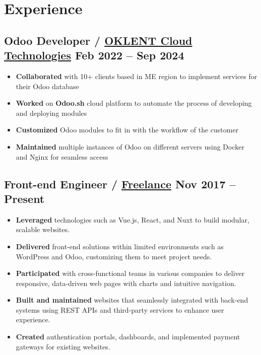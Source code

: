 \section*{Experience}
%
%
%
\subsection*{
  Odoo Developer / \href{https://oklent.com/}{OKLENT Cloud Technologies}
  \hspace*{\fill}
  \dateformat Feb 2022 -- Sep 2024
}
\begin{itemize}
  \item \textbf{Collaborated} with 10+ clients based in ME region to implement services for their Odoo database
  \item \textbf{Worked} on \textbf{Odoo.sh} cloud platform to automate the process of developing and deploying modules
  \item \textbf{Customized} Odoo modules to fit in with the workflow of the customer
  \item \textbf{Maintained} multiple instances of Odoo on different servers using Docker and Nginx for seamless access
\end{itemize}
%
%
\subsection*{
  Front-end Engineer / \href{https://bumbleboss.xyz/}{Freelance}
  \hspace*{\fill}
  \dateformat Nov 2017 -- Present
}
\begin{itemize}
  \item \textbf{Leveraged} technologies such as Vue.js, React, and Nuxt to build modular, scalable websites.
  \item \textbf{Delivered} front-end solutions within limited environments such as WordPress and Odoo, customizing them to meet project needs.
  \item \textbf{Participated} with cross-functional teams in various companies to deliver responsive, data-driven web pages with charts and intuitive navigation.
  \item \textbf{Built and maintained} websites that seamlessly integrated with back-end systems using REST APIs and third-party services to enhance user experience.
  \item \textbf{Created} authentication portals, dashboards, and implemented payment gateways for existing websites.
\end{itemize}
